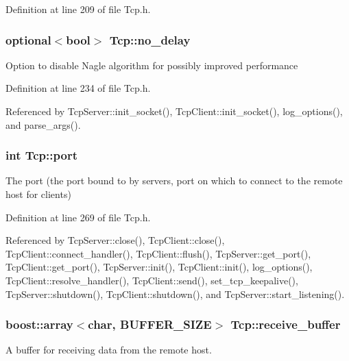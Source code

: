 Definition at line 209 of file Tcp.h.

\hypertarget{classTcp_a00a788b6d5b91b31b340f942617b9dda}{
\subsubsection[{no\_\-delay}]{\setlength{\rightskip}{0pt plus 5cm}optional$<$bool$>$ {\bf Tcp::no\_\-delay}}}
\label{classTcp_a00a788b6d5b91b31b340f942617b9dda}
Option to disable Nagle algorithm for possibly improved performance 

Definition at line 234 of file Tcp.h.



Referenced by TcpServer::init\_\-socket(), TcpClient::init\_\-socket(), log\_\-options(), and parse\_\-args().

\hypertarget{classTcp_a7ed15f78afc9d0675404b4b41cc723ba}{
\subsubsection[{port}]{\setlength{\rightskip}{0pt plus 5cm}int {\bf Tcp::port}}}
\label{classTcp_a7ed15f78afc9d0675404b4b41cc723ba}
The port (the port bound to by servers, port on which to connect to the remote host for clients) 

Definition at line 269 of file Tcp.h.



Referenced by TcpServer::close(), TcpClient::close(), TcpClient::connect\_\-handler(), TcpClient::flush(), TcpServer::get\_\-port(), TcpClient::get\_\-port(), TcpServer::init(), TcpClient::init(), log\_\-options(), TcpClient::resolve\_\-handler(), TcpClient::send(), set\_\-tcp\_\-keepalive(), TcpServer::shutdown(), TcpClient::shutdown(), and TcpServer::start\_\-listening().

\hypertarget{classTcp_aeb630e95d24f26852437098df5896b16}{
\subsubsection[{receive\_\-buffer}]{\setlength{\rightskip}{0pt plus 5cm}boost::array$<$char, {\bf BUFFER\_\-SIZE}$>$ {\bf Tcp::receive\_\-buffer}}}
\label{classTcp_aeb630e95d24f26852437098df5896b16}
A buffer for receiving data from the remote host. 

